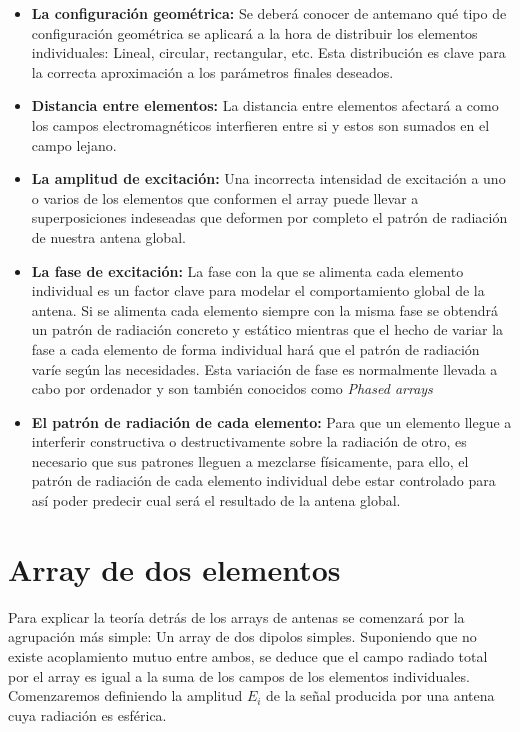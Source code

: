 \begin{itemize}
\item \textbf{La configuración geométrica: }Se deberá conocer de antemano qué tipo de configuración geométrica se aplicará a la hora de distribuir los elementos individuales: Lineal, circular, rectangular, etc. Esta distribución es clave para la correcta aproximación a los parámetros finales deseados.

\item \textbf{Distancia entre elementos: }La distancia entre elementos  afectará a como los campos electromagnéticos interfieren entre si y estos son sumados en el campo lejano.

\item \textbf{La amplitud de excitación: }Una incorrecta intensidad de excitación a uno o varios de los elementos que conformen el array puede llevar a superposiciones indeseadas que deformen por completo el patrón de radiación de nuestra antena global.

\item \textbf{La fase de excitación: }La fase con la que se alimenta cada elemento individual es un factor clave para modelar el comportamiento global de la antena. Si se alimenta cada elemento siempre con la misma fase se obtendrá un patrón de radiación concreto y estático mientras que el hecho de variar la fase a cada elemento de forma individual hará que el patrón de radiación varíe según las necesidades. Esta variación de fase es normalmente llevada a cabo por ordenador y son también conocidos como \textit{Phased arrays}

\item \textbf{El patrón de radiación de cada elemento: }Para que un elemento llegue a interferir constructiva o destructivamente sobre la radiación de otro, es necesario que sus patrones lleguen a mezclarse físicamente, para ello, el patrón de radiación de cada elemento individual debe estar controlado para así poder predecir cual será el resultado de la antena global.
\end{itemize}

\section{Array de dos elementos}

\par Para explicar la teoría detrás de los arrays de antenas se comenzará por la agrupación más simple: Un array de dos dipolos simples. Suponiendo que no existe acoplamiento mutuo entre ambos, se deduce que el campo radiado total por el array es igual a la suma de los campos de los elementos individuales. Comenzaremos definiendo la amplitud \textit{$E_{i}$} de la señal producida por una antena cuya radiación es esférica. 

